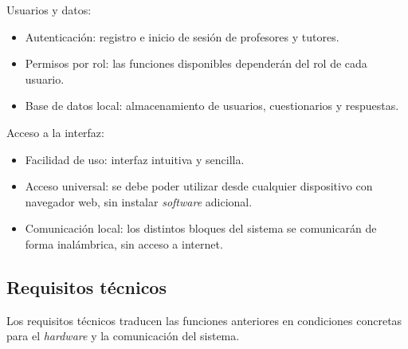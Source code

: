 Usuarios y datos:

\begin{itemize}

\item Autenticación: registro e inicio de sesión de profesores y tutores.

\item Permisos por rol: las funciones disponibles dependerán del rol de cada usuario.

\item Base de datos local: almacenamiento de usuarios, cuestionarios y respuestas.

\end{itemize}

Acceso a la interfaz:

\begin{itemize}

\item Facilidad de uso: interfaz intuitiva y sencilla.

\item Acceso universal: se debe poder utilizar desde cualquier dispositivo con navegador web, sin instalar \emph{software} adicional.

\item Comunicación local: los distintos bloques del sistema se comunicarán de forma inalámbrica, sin acceso a internet.

\end{itemize}

\subsection{Requisitos técnicos}

Los requisitos técnicos traducen las funciones anteriores en condiciones concretas para el \emph{hardware} y la comunicación del sistema.

